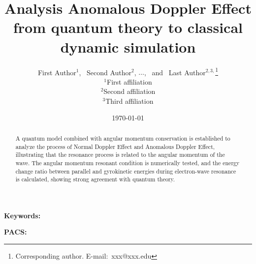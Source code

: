 \documentclass{cpbtex}
\begin{document}
\begin{CJK*}{GBK}{song}

\title{Analysis Anomalous Doppler Effect from quantum theory to classical dynamic simulation}


\author{First Author$^{1}$, \ Second Author$^{2}$, $\ldots$, \ and \ Last Author$^{2,3,}$\thanks{Corresponding author. E-mail:~xxx@xxx.edu}\\
$^{1}${First affiliation}\\  %
$^{2}${Second affiliation}\\ %
$^{3}${Third affiliation}}   %


\date{\today}
\maketitle

\begin{abstract}
A quantum model combined with angular momentum conservation is established to analyze the process of Normal Doppler Effect and Anomalous Doppler Effect, illustrating that the resonance process is related to the angular momentum of the wave. The angular momentum resonant condition is numerically tested, and the energy change ratio between parallel and gyrokinetic energies during electron-wave resonance is calculated, showing strong agreement with quantum theory.
\end{abstract}

\textbf{Keywords:} %

\textbf{PACS:} %



\end{CJK*}
\end{document}
